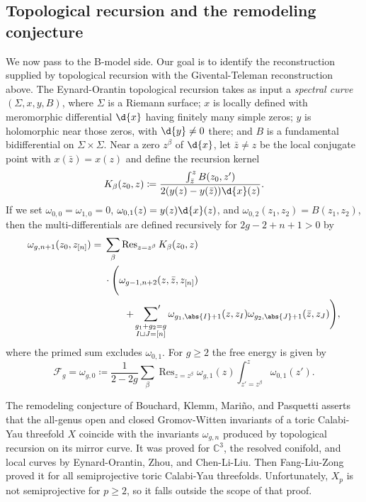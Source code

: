 \documentclass{amsart}
\theoremstyle{definition}
\theoremstyle{remark}
\theoremstyle{plain}
\theoremstyle{definition}
\theoremstyle{remark}
\newcommand{\C}{\mathbb{C}}
\newcommand{\mc}[1]{\mathcal{#1}}
\newcommand{\on}[1]{\operatorname{#1}}
\newcommand{\1}{\mathbf{1}}
\newcommand{\2}{\mathbf{2}}
\newcommand{\3}{\mathbf{3}}
\begin{document}
\subsection{Topological recursion and the remodeling conjecture}%
\label{sub:Topological recursion and the remodeling conjecture}

We now pass to the B-model side. Our goal is to identify the reconstruction supplied by topological recursion with the Givental-Teleman reconstruction above. The Eynard-Orantin topological recursion takes as input a \textit{spectral curve} \((\Sigma,x,y,B)\), where \(\Sigma\) is a Riemann surface; \(x\) is locally defined with meromorphic differential \(\d{x}\) having finitely many simple zeros; \(y\) is holomorphic near those zeros, with \(\d{y} \neq 0\) there; and \(B\) is a fundamental bidifferential on \(\Sigma \times \Sigma\). Near a zero \(z^{\beta}\) of \(\d{x}\), let \(\bar{z} \neq z\) be the local conjugate point with \(x(\bar{z}) = x(z)\) and define the recursion kernel
\[ K_{\beta}(z_0,z) \coloneqq \frac{\int_{\bar{z}}^z B(z_0,z')}{2(y(z)-y(\bar{z}))\d{x}(z)}. \]
If we set \(\omega_{0,0} = \omega_{1,0} = 0\), \(\omega_{0,1}(z) = y(z)\d{x}(z)\), and \(\omega_{0,2}(z_1,z_2) = B(z_1,z_2)\), then the multi-differentials are defined recursively for \(2g-2+n+1 > 0\) by
\begin{align*}
    \omega_{g,n+1}(z_0,z_{[n]}) ={}& \sum_{\beta}\on{Res}_{z = z^{\beta}} K_{\beta}(z_0,z) \\
    &\cdot \Bigg( \omega_{g-1,n+2}(z,\bar{z},z_{[n]}) \\
    &\qquad + \sideset{}{'}\sum_{\substack{g_1+g_2 = g \\ I \sqcup J = [n]}}\omega_{g_1,\abs{I}+1}(z,z_I)\omega_{g_2,\abs{J}+1}(\bar{z},z_J)\Bigg),
\end{align*}
where the primed sum excludes \(\omega_{0,1}\). For \(g \geq 2\) the free energy is given by
\[ \mc{F}_g = \omega_{g,0} \coloneqq \frac{1}{2-2g}\sum_{\beta}\on{Res}_{z=z^{\beta}}\omega_{g,1}(z)\int_{z'=z^{\beta}}^z \omega_{0,1}(z'). \]

The remodeling conjecture of Bouchard, Klemm, Mari\~{n}o, and Pasquetti asserts that the all-genus open and closed Gromov-Witten invariants of a toric Calabi-Yau threefold \(X\) coincide with the invariants \(\omega_{g,n}\) produced by topological recursion on its mirror curve. It was proved for \(\C^3\), the resolved conifold, and local curves by Eynard-Orantin, Zhou, and Chen-Li-Liu. Then Fang-Liu-Zong proved it for all semiprojective toric Calabi-Yau threefolds. Unfortunately, \(X_p\) is not semiprojective for \(p \geq 2\), so it falls outside the scope of that proof.
\end{document}
